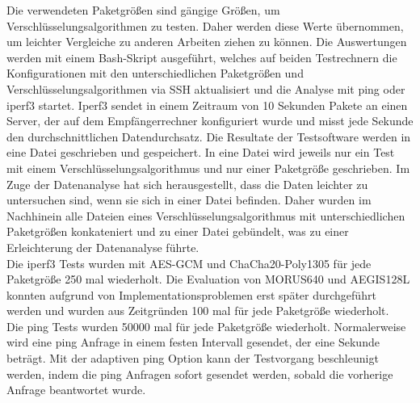 Die verwendeten Paketgrößen sind gängige Größen, um Verschlüsselungsalgorithmen zu testen. Daher werden diese Werte übernommen, um leichter Vergleiche zu anderen Arbeiten ziehen zu können.
Die Auswertungen werden mit einem Bash-Skript ausgeführt, welches auf beiden Testrechnern die Konfigurationen mit den unterschiedlichen Paketgrößen und Verschlüsselungsalgorithmen via \gls{SSH} aktualisiert und die Analyse mit ping oder iperf3 startet.
Iperf3 sendet in einem Zeitraum von 10 Sekunden Pakete an einen Server, der auf dem Empfängerrechner konfiguriert wurde und misst jede Sekunde den durchschnittlichen Datendurchsatz. Die Resultate der Testsoftware werden in eine Datei geschrieben und gespeichert. In eine Datei wird jeweils nur ein Test mit einem Verschlüsselungsalgorithmus und nur einer Paketgröße geschrieben. Im Zuge der Datenanalyse hat sich herausgestellt, dass die Daten leichter zu untersuchen sind, wenn sie sich in einer Datei befinden. Daher wurden im Nachhinein alle Dateien eines Verschlüsselungsalgorithmus mit unterschiedlichen Paketgrößen konkateniert und zu einer Datei gebündelt, was zu einer Erleichterung der Datenanalyse führte.\\
Die iperf3 Tests wurden mit \gls{AES-GCM} und ChaCha20-Poly1305 für jede Paketgröße 250 mal wiederholt. Die Evaluation von MORUS640 und AEGIS128L konnten aufgrund von Implementationsproblemen erst später durchgeführt werden und wurden aus Zeitgründen 100 mal für jede Paketgröße wiederholt. \\
Die ping Tests wurden 50000 mal für jede Paketgröße wiederholt. Normalerweise wird eine ping Anfrage in einem festen Intervall gesendet, der eine Sekunde beträgt. Mit der adaptiven ping Option kann der Testvorgang beschleunigt werden, indem die ping Anfragen sofort gesendet werden, sobald die vorherige Anfrage beantwortet wurde. 

